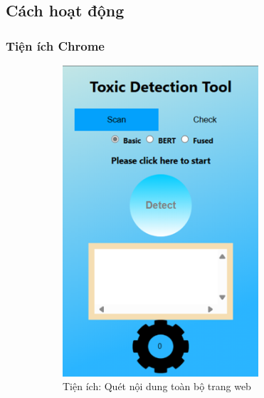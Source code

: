 \subsection{Cách hoạt động}

\subsubsection{Tiện ích Chrome}
\begin{figure}[htb!]
    \begin{subfigure}[b]{0.33\textwidth}
        \centering
        \includegraphics[width=0.8\textwidth]{image/ex_web.png}
        \caption{Tiện ích: Quét nội dung toàn bộ trang web}
        \label{figure:ex_web}
    \end{subfigure}%
    \begin{subfigure}[b]{0.33\textwidth}
        \centering

\end{subfigure}
\end{figure}
